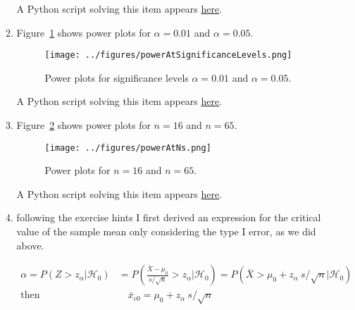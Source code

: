 \documentclass[12pt]{article}
\begin{document}
\begin{enumerate}
\begin{enumerate}
                A Python script solving this item appears
                \href{https://github.com/joacorapela/neuroinformatics24/blob/master/worksheets/01_tTestAndRandomizationTests/mySolution/code/doPowerExa.py}{here}.

            \item Figure~\ref{fig:powerAtSignificanceLevels} shows power plots for
                $\alpha=0.01$ and $\alpha=0.05$.

                \begin{figure}
                    \begin{center}
                        \texttt{[image: ../figures/powerAtSignificanceLevels.png]}
                    \end{center}
                    \caption{Power plots for significance levels $\alpha=0.01$ and
                    $\alpha=0.05$.}
                    \label{fig:powerAtSignificanceLevels}
                \end{figure}

                A Python script solving this item appears
                \href{https://github.com/joacorapela/neuroinformatics24/blob/master/worksheets/01_tTestAndRandomizationTests/mySolution/code/doPowerExb.py}{here}.

            \item Figure~\ref{fig:powerAtNs} shows power plots for
                $n=16$ and $n=65$.

                \begin{figure}
                    \begin{center}
                        \texttt{[image: ../figures/powerAtNs.png]}
                    \end{center}
                    \caption{Power plots for $n=16$ and $n=65$.}
                    \label{fig:powerAtNs}
                \end{figure}

                A Python script solving this item appears
                \href{https://github.com/joacorapela/neuroinformatics24/blob/master/worksheets/01_tTestAndRandomizationTests/mySolution/code/doPowerExc.py}{here}.

            \item following the exercise hints I first derived an expression
                for the critical value of the sample mean only considering the
                type I error, as we did above.

                \begin{align}
                    \alpha=P(Z>z_\alpha|\mathcal{H}_0)&=P(\frac{\bar{X}-\mu_0}{s/\sqrt{n}}>z_\alpha|\mathcal{H}_0)=P(\bar{X}>\mu_0+z_\alpha\
                    s/\sqrt{n}|\mathcal{H}_0)\nonumber\\
                    \text{then}&\quad\bar{x}_{c0}=\mu_0+z_\alpha\ s/\sqrt{n}\label{eq:nullCritical}
                \end{align}


\end{enumerate}
\end{enumerate}
\end{document}
